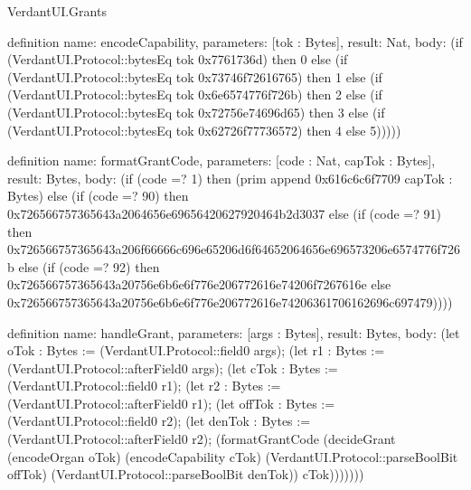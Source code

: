 \begin{lexlean}{VerdantUI.Grants}
\begin{semanticmodule}
definition{
  name: encodeCapability,
  parameters: [tok : Bytes],
  result: Nat,
  body: (if (VerdantUI.Protocol::bytesEq tok 0x7761736d) then 0 else
    (if (VerdantUI.Protocol::bytesEq tok 0x73746f72616765) then 1 else
    (if (VerdantUI.Protocol::bytesEq tok 0x6e6574776f726b) then 2 else
    (if (VerdantUI.Protocol::bytesEq tok 0x72756e74696d65) then 3 else
    (if (VerdantUI.Protocol::bytesEq tok 0x62726f77736572) then 4 else 5)))))
}

definition{
  name: formatGrantCode,
  parameters: [code : Nat, capTok : Bytes],
  result: Bytes,
  body: (if (code =? 1) then (prim append 0x616c6c6f7709 capTok : Bytes) else
    (if (code =? 90) then 0x726566757365643a2064656e69656420627920464b2d3037 else
    (if (code =? 91) then 0x726566757365643a206f66666c696e65206d6f64652064656e696573206e6574776f726b else
    (if (code =? 92) then 0x726566757365643a20756e6b6e6f776e206772616e74206f7267616e else
    0x726566757365643a20756e6b6e6f776e206772616e74206361706162696c697479))))
}

definition{
  name: handleGrant,
  parameters: [args : Bytes],
  result: Bytes,
  body: (let oTok : Bytes := (VerdantUI.Protocol::field0 args);
    (let r1 : Bytes := (VerdantUI.Protocol::afterField0 args);
    (let cTok : Bytes := (VerdantUI.Protocol::field0 r1);
    (let r2 : Bytes := (VerdantUI.Protocol::afterField0 r1);
    (let offTok : Bytes := (VerdantUI.Protocol::field0 r2);
    (let denTok : Bytes := (VerdantUI.Protocol::afterField0 r2);
    (formatGrantCode (decideGrant (encodeOrgan oTok) (encodeCapability cTok) (VerdantUI.Protocol::parseBoolBit offTok) (VerdantUI.Protocol::parseBoolBit denTok)) cTok)))))))
}
\end{semanticmodule}
\end{lexlean}

